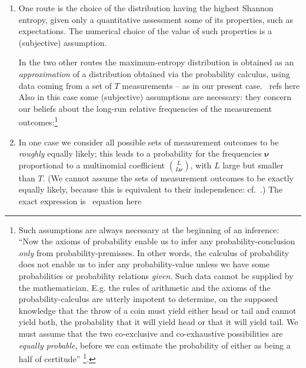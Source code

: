 \documentclass[\ifafour a4paper,12pt,\else a5paper,10pt,\fi%
onecolumn,oneside,article,%
british%
]{memoir}
\makeatletter
\theoremstyle{remark}
\theoremstyle{innote}
\def\sum{\DOTSI\sumop\slimits@}
\def\prod{\DOTSI\prodop\slimits@}
\newcommand*{\citep}{\footcites}
\newcommand*{\delt}{\deltaup}%
\newcommand*{\di}{\mathrm{d}}%
\newcommand*{\pf}{\mathrm{p}}%
\newcommand*{\p}{\mathrm{P}}%
\renewcommand*{\|}[1][]{\nonscript\,#1\vert\nonscript\;\mathopen{}}
\newcommand*{\sect}{\S}%
\newcommand*{\cf}{{cf.}}
\newcommand*{\tprod}{\mathop{\textstyle\prod}\nolimits}
\newcommand*{\tsum}{\mathop{\textstyle\sum}\nolimits}
\newcommand*{\puzzle}{{\fontencoding{U}\fontfamily{fontawesometwo}\selectfont\symbol{225}}}
\newcommand{\mynote}[1]{ {\color{notecolour}\puzzle\ #1}}
\newcommand*{\yAv}{A}
\newcommand*{\yff}{f}
\newcommand*{\yf}{\bm{\yff}}
\newcommand*{\yA}{\yAv}%
\newcommand*{\ynuu}{\nu}
\newcommand*{\ynu}{\bm{\ynuu}}
\makeatother
\begin{document}
\begin{enumerate}[wide,label=(\alph*)]
\item \label{item:entropy_route}One route is the choice of the distribution having the highest
  Shannon entropy, given only a quantitative assessment some of its
  properties, such as expectations. The numerical choice of the value of
  such properties is a (subjective) assumption.

  \medskip

  In the two other routes the maximum-entropy distribution is obtained as
  an \emph{approximation} of a distribution obtained via the probability
  calculus, using data coming from a set of $T$ measurements -- as in our
  present case.\mynote{refs here} Also in this case some (subjective)
  assumptions are necessary: they concern our beliefs about the long-run
  relative frequencies of the measurement outcomes:\footnote{Such
    assumptions are always necessary at the beginning of an inference:
    \enquote{Now the axioms of probability enable us to infer any
      probability-conclusion \emph{only} from probability-premisses. In
      other words, the calculus of probability does not enable us to infer
      any probability-value unless we have some probabilities or
      probability relations \emph{given}. Such data cannot be supplied by
      the mathematician. E.g. the rules of arithmetic and the axioms of the
      probability-calculus are utterly impotent to determine, on the
      supposed knowledge that the throw of a coin must yield either head or
      tail and cannot yield both, the probability that it will yield head
      or that it will yield tail. We must assume that the two co-exclusive
      and co-exhaustive possibilities are \emph{equally probable}, before
      we can estimate the probability of either as being a half of
      certitude} \citep[\emph{Appendix on eduction}, \sect~5,
    p.~182]{johnson1924}.}

\item \label{item:entr_prior_route}In one case we consider all possible
  sets of measurement outcomes to be \emph{roughly} equally likely; this
  leads to a probability for the frequencies $\ynu$ proportional to a
  multinomial coefficient $\binom{L}{L\ynu}$, with $L$ large but smaller
  than $T$. (We cannot assume the sets of measurement outcomes to be
  exactly equally likely, because this is equivalent to their independence:
  \cf\
  \cites[\sect~6.7]{jaynes1994_r2003}[\sect~B]{portamana2009}[\sect~2]{portamana2017}.)
  The exact expression is\mynote{equation here}


\end{enumerate}
\end{document}
